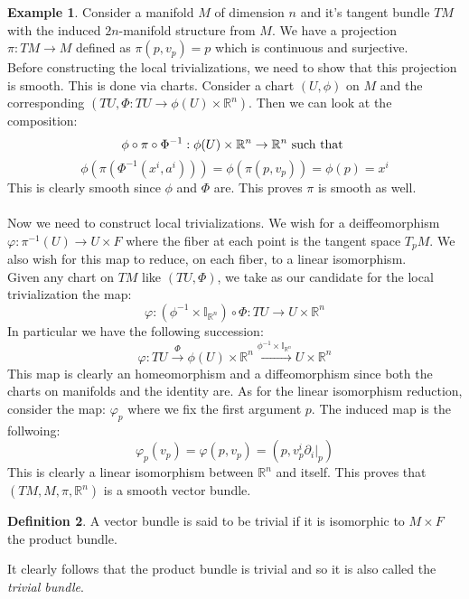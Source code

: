 \documentclass[12pt,a4paper]{report}
\theoremstyle{definition}
\newtheorem{Def}{Definition}[chapter]
\theoremstyle{Theorem}
\theoremstyle{definition}
\newtheorem{Ex}[Def]{Example}
\theoremstyle{definition}
\begin{document}
			\begin{Ex}
				Consider a manifold $M$ of dimension $n$ and it's tangent bundle $TM$ with the induced $2n$-manifold structure from $M$. We have a projection $\pi:TM\rightarrow M$ defined as $\pi(p,v_p)=p$ which is continuous and surjective. 
				\\
				Before constructing the local trivializations, we need to show that this projection is smooth. This is done via charts. Consider a chart $(U,\phi)$ on $M$ and the corresponding $(TU,\Phi:TU\rightarrow \phi(U)\times \mathbb{R}^n)$. Then we can look at the composition:
				$$\phi\circ \pi\circ \Phi^{-1}:\phi(U)\times \mathbb{R}^n\rightarrow \mathbb{R}^n \hbox{ such that }$$ 
				$$\phi(\pi(\Phi^{-1}(x^i,a^i)))=\phi(\pi(p,v_p))=\phi(p)=x^i$$
				This is clearly smooth since $\phi$ and $\Phi$ are. This proves $\pi$ is smooth as well.\\
				\\
				Now we need to construct local trivializations. We wish for a deiffeomorphism $\varphi:\pi^{-1}(U)\rightarrow U\times F$ where the fiber at each point is the tangent space $T_pM$. We also wish for this map to reduce, on each fiber, to a linear isomorphism.\\
				Given any chart on $TM$ like $(TU,\Phi)$, we take as our candidate for the local trivialization the map: 
				$$\varphi:(\phi^{-1}\times \mathbb{I}_{\mathbb{R}^n})\circ \Phi:TU\rightarrow U\times \mathbb{R}^n$$
				In particular we have the following succession:
				$$\varphi:TU\xrightarrow{\text{$\Phi$}} \phi(U)\times \mathbb{R}^n\xrightarrow{\text{$\phi^{-1}\times \mathbb{I}_{\mathbb{R}^n}$}}U\times \mathbb{R}^n$$
				This map is clearly an homeomorphism and a diffeomorphism since both the charts on manifolds and the identity are. As for the linear isomorphism reduction, consider the map:
				$\varphi_p$ where we fix the first argument $p$. The induced map is the follwoing:
				$$\varphi_p(v_p)=\varphi(p,v_p)=(p,v^i_p\partial_i|_p)$$
				This is clearly a linear isomorphism between $\mathbb{R}^n$ and itself. This proves that $(TM,M,\pi,\mathbb{R}^n)$ is a smooth vector bundle.
			\end{Ex}
			\begin{Def}\label{Def_5.3}
				A vector bundle is said to be trivial if it is isomorphic to $M\times F$ the product bundle.
			\end{Def}
			It clearly follows that the product bundle is trivial and so it is also called the \textit{trivial bundle}.
			
		
\end{document}
